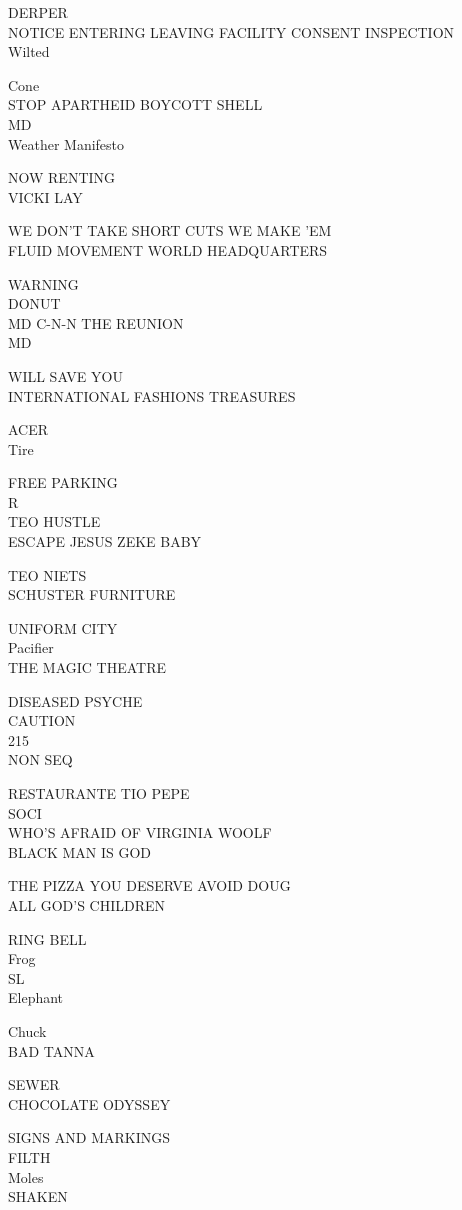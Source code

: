 \documentclass[10pt,letterpaper]{article}
\begin{document}
DERPER\\
NOTICE ENTERING LEAVING FACILITY CONSENT INSPECTION\\
Wilted

Cone\\
STOP APARTHEID BOYCOTT SHELL\\
MD\\
Weather Manifesto

NOW RENTING\\
VICKI LAY

WE DON'T TAKE SHORT CUTS WE MAKE 'EM\\
FLUID MOVEMENT WORLD HEADQUARTERS

WARNING\\
DONUT\\
MD C{-}N{-}N THE REUNION\\
MD

WILL SAVE YOU\\
INTERNATIONAL FASHIONS TREASURES

ACER\\
Tire

FREE PARKING\\
R\\
TEO HUSTLE\\
ESCAPE JESUS ZEKE BABY

TEO NIETS\\
SCHUSTER FURNITURE

UNIFORM CITY\\
Pacifier\\
THE MAGIC THEATRE

DISEASED PSYCHE\\
CAUTION\\
215\\
NON SEQ

RESTAURANTE TIO PEPE\\
SOCI\\
WHO'S AFRAID OF VIRGINIA WOOLF\\
BLACK MAN IS GOD

THE PIZZA YOU DESERVE AVOID DOUG\\
ALL GOD'S CHILDREN

RING BELL\\
Frog\\
SL\\
Elephant

Chuck\\
BAD TANNA

SEWER\\
CHOCOLATE ODYSSEY

SIGNS AND MARKINGS\\
FILTH\\
Moles\\
SHAKEN
\end{document}
